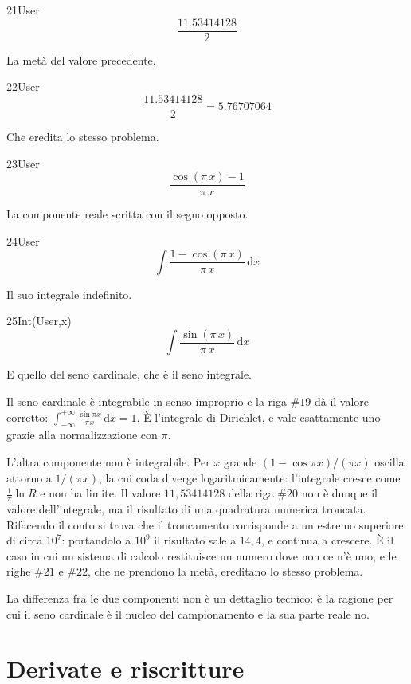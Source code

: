 \begin{espr}{21}{User}{}
\[
\frac{11.53414128}{2}
\]
\end{espr}
La metà del valore precedente.

\begin{espr}{22}{User}{\verificata}
\[
\frac{11.53414128}{2} = 5.76707064
\]
\end{espr}
Che eredita lo stesso problema.

\begin{espr}{23}{User}{}
\[
\frac{\cos\!\left(\pi\, x\right) - 1}{\pi\, x}
\]
\end{espr}
La componente reale scritta con il segno opposto.

\begin{espr}{24}{User}{}
\[
\int \frac{1 - \cos\!\left(\pi\, x\right)}{\pi\, x} \,\mathrm{d}x
\]
\end{espr}
Il suo integrale indefinito.

\begin{espr}{25}{Int(User,x)}{}
\[
\int \frac{\sin\!\left(\pi\, x\right)}{\pi\, x} \,\mathrm{d}x
\]
\end{espr}
E quello del seno cardinale, che è il seno integrale.


Il seno cardinale è integrabile in senso improprio e la riga $\#19$ dà il valore corretto: $\int_{-\infty}^{+\infty}\frac{\sin\pi x}{\pi x}\,\mathrm{d}x=1$. È l'integrale di Dirichlet, e vale esattamente uno grazie alla normalizzazione con $\pi$.

L'altra componente non è integrabile. Per $x$ grande $\left(1-\cos\pi x\right)/(\pi x)$ oscilla attorno a $1/(\pi x)$, la cui coda diverge logaritmicamente: l'integrale cresce come $\frac{1}{\pi}\ln R$ e non ha limite. Il valore $11{,}53414128$ della riga $\#20$ non è dunque il valore dell'integrale, ma il risultato di una quadratura numerica troncata. Rifacendo il conto si trova che il troncamento corrisponde a un estremo superiore di circa $10^7$: portandolo a $10^9$ il risultato sale a $14{,}4$, e continua a crescere. È il caso in cui un sistema di calcolo restituisce un numero dove non ce n'è uno, e le righe $\#21$ e $\#22$, che ne prendono la metà, ereditano lo stesso problema.

La differenza fra le due componenti non è un dettaglio tecnico: è la ragione per cui il seno cardinale è il nucleo del campionamento e la sua parte reale no.

\section{Derivate e riscritture}

